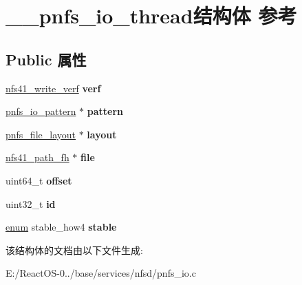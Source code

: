 \hypertarget{struct____pnfs__io__thread}{}\section{\+\_\+\+\_\+pnfs\+\_\+io\+\_\+thread结构体 参考}
\label{struct____pnfs__io__thread}
\subsection*{Public 属性}
\begin{DoxyCompactItemize}
\item 
\mbox{\label{struct____pnfs__io__thread_a3f8fbdde5c31800585f81fcbc904df06}} 
\hyperlink{struct____nfs41__write__verf}{nfs41\+\_\+write\+\_\+verf} {\bfseries verf}
\item 
\mbox{\label{struct____pnfs__io__thread_a893a80c32040bd7c75507c20503d7e6a}} 
\hyperlink{struct____pnfs__io__pattern}{pnfs\+\_\+io\+\_\+pattern} $\ast$ {\bfseries pattern}
\item 
\mbox{\label{struct____pnfs__io__thread_ab80c47e0063522e3b32f6c19fde93b7a}} 
\hyperlink{struct____pnfs__file__layout}{pnfs\+\_\+file\+\_\+layout} $\ast$ {\bfseries layout}
\item 
\mbox{\label{struct____pnfs__io__thread_a20a5f76e1ae1d00e748471548b3abd4c}} 
\hyperlink{struct____nfs41__path__fh}{nfs41\+\_\+path\+\_\+fh} $\ast$ {\bfseries file}
\item 
\mbox{\label{struct____pnfs__io__thread_ab8c5db1c7d1b158d949c5f5754cd15fe}} 
uint64\+\_\+t {\bfseries offset}
\item 
\mbox{\label{struct____pnfs__io__thread_aceadd568e2191930ed008b17018dace5}} 
uint32\+\_\+t {\bfseries id}
\item 
\mbox{\label{struct____pnfs__io__thread_aa48747dfa2108b0be196c281358bc91b}} 
\hyperlink{interfaceenum}{enum} stable\+\_\+how4 {\bfseries stable}
\end{DoxyCompactItemize}


该结构体的文档由以下文件生成\+:\begin{DoxyCompactItemize}
\item 
E\+:/\+React\+O\+S-\/0../base/services/nfsd/pnfs\+\_\+io.\+c\end{DoxyCompactItemize}
